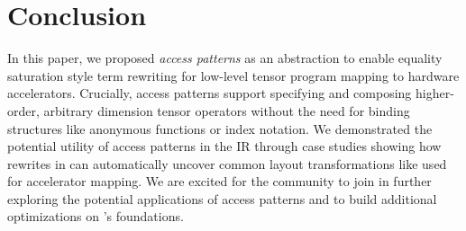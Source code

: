 
    
\section{Conclusion}
\label{sec:conclusion}

In this paper,
  we proposed \textit{access patterns} as an
  abstraction to enable equality saturation
  style term rewriting for low-level
  tensor program mapping to hardware accelerators.
Crucially, access patterns support
  specifying and composing
  higher-order, arbitrary dimension
  tensor operators without the need
  for binding structures like anonymous functions
  or index notation.
We demonstrated the potential utility of
  access patterns in the \g IR through
  case studies showing how rewrites in \g
  can automatically uncover common
  layout transformations like 
  used for accelerator mapping.
We are excited for the community
  to join in further exploring the potential
  applications of access patterns and to
  build additional optimizations on
  \g's foundations.
